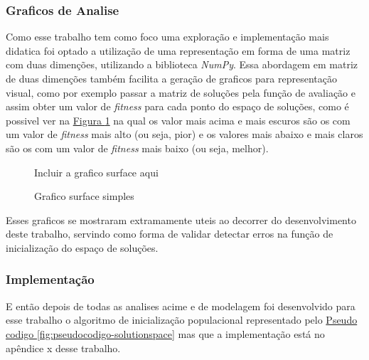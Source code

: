         \subsubsection{Graficos de Analise}
            Como esse trabalho tem como foco uma exploração e implementação mais didatica foi optado a utilização de uma representação em forma de uma matriz com duas dimenções, utilizando a biblioteca \textit{NumPy}. Essa abordagem em matriz de duas dimenções também facilita a geração de graficos para representação visual, como por exemplo passar a matriz de soluções pela função de avaliação e assim obter um valor de \textit{fitness} para cada ponto do espaço de soluções, como é possivel ver na 
            \hyperref[fig:surfaceplot]{Figura \ref{fig:surfaceplot}} 
            na qual os valor mais acima e mais escuros são os com um valor de \textit{fitness} mais alto (ou seja, pior) e os valores mais abaixo e mais claros são os com um valor de \textit{fitness} mais baixo (ou seja, melhor).\newline

            \begin{figure}[h]
                \centering
                \small{Incluir a grafico surface aqui}
                \caption{Grafico surface simples}
                \label{fig:surfaceplot}
            \end{figure}

            Esses graficos se mostraram extramamente uteis ao decorrer do desenvolvimento deste trabalho, servindo como forma de validar detectar erros na função de inicialização do espaço de soluções.\newline




        

        \subsubsection{Implementação}
            E então depois de todas as analises acime e de modelagem foi desenvolvido para esse trabalho o algoritmo de inicialização populacional representado pelo 
            \hyperref[fig:pseudocodigo-solutionspace]{Pseudo codigo \ref{fig:pseudocodigo-solutionspace}} 
            mas que a implementação está no apêndice x desse trabalho.\hfill

